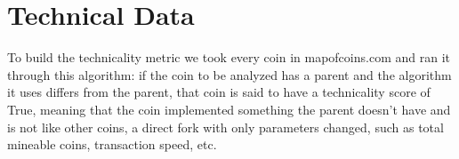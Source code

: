 \section{Technical Data}
To build the technicality metric we took every coin in mapofcoins.com and ran it through this algorithm: if the coin to be analyzed has a parent and the algorithm it uses differs from the parent, that coin is said to have a technicality score of True, meaning that the coin implemented something the parent doesn't have and is not like other coins, a direct fork with only parameters changed, such as total mineable coins, transaction speed, etc.

